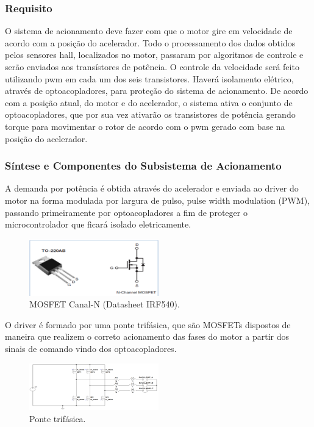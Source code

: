 		\subsubsection{Requisito}
		O sistema de acionamento deve fazer com que o motor gire em velocidade de acordo com a posição do acelerador. Todo o processamento dos dados obtidos pelos sensores hall, localizados no motor, passaram por algoritmos de controle e serão enviados aos transístores de potência. O controle da velocidade será feito utilizando pwm em cada um dos seis transistores. Haverá isolamento elétrico, através de optoacopladores, para proteção do sistema de acionamento.
		De acordo com a posição atual, do motor e do acelerador, o sistema ativa o conjunto de optoacopladores, que por sua vez ativarão os transistores de potência gerando torque para movimentar o rotor de acordo com o pwm gerado com base na posição do acelerador.
	
	
		\subsubsection{Síntese e Componentes do Subsistema de Acionamento}
		A demanda por potência é obtida através do acelerador e enviada ao driver do motor na forma modulada por largura de pulso, pulse width modulation (PWM), passando primeiramente por optoacopladores a fim de proteger o microcontrolador que ficará isolado eletricamente.
		
			\graphicspath{{figuras/}}
			\begin{figure}[h!]
				\centering
				\includegraphics[width=0.5\textwidth]{Figura_3_MOSFET.PNG}
				\caption{MOSFET Canal-N (Datasheet IRF540).}
				\label{img:MOSFET}
			\end{figure}
		
		O driver é formado por uma ponte trifásica, que são MOSFETs dispostos de maneira que realizem o correto acionamento das fases do motor a partir dos sinais de comando vindo dos optoacopladores.
		
			\graphicspath{{figuras/}}
			\begin{figure}[h!]
				\centering
				\includegraphics[width=0.5\textwidth]{Figura4_Ponte_Trifasica.PNG}
				\caption{Ponte trifásica.}
				\label{img:Ponte_Trifasica}
			\end{figure}
		
